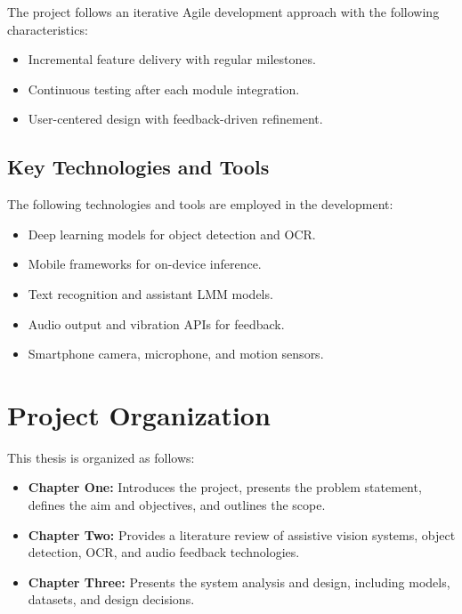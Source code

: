 \documentclass[a4paper]{report}
\begin{document}
The project follows an iterative Agile development approach with the following characteristics:

\begin{itemize}
    \item Incremental feature delivery with regular milestones.
    \item Continuous testing after each module integration.
    \item User-centered design with feedback-driven refinement.
\end{itemize}

\subsection{Key Technologies and Tools}

The following technologies and tools are employed in the development:

\begin{itemize}
    \item Deep learning models for object detection and OCR.
    \item Mobile frameworks for on-device inference.
    \item Text recognition and assistant LMM models.
    \item Audio output and vibration APIs for feedback.
    \item Smartphone camera, microphone, and motion sensors.
\end{itemize}

\section{Project Organization}
\label{sec:organization}

This thesis is organized as follows:

\begin{itemize}
    \item \textbf{Chapter One:} Introduces the project, presents the problem statement, defines the aim and objectives, and outlines the scope.
    \item \textbf{Chapter Two:} Provides a literature review of assistive vision systems, object detection, OCR, and audio feedback technologies.
    \item \textbf{Chapter Three:} Presents the system analysis and design, including models, datasets, and design decisions.
\end{itemize}
\end{document}
